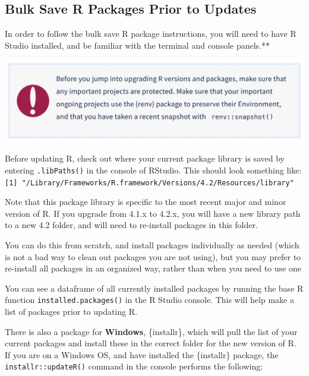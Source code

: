 \documentclass[
]{book}
\begin{document}
\hypertarget{bulk-save-r-packages-prior-to-updates}{%
\subsection{Bulk Save R Packages Prior to Updates}\label{bulk-save-r-packages-prior-to-updates}}

In order to follow the bulk save R package instructions, you will need to have R Studio installed, and be familiar with the terminal and console panels.**

\begin{flushleft}\includegraphics[width=1\linewidth]{images/renv} \end{flushleft}

Before updating R, check out where your current package library is saved by entering \texttt{.libPaths()} in the console of RStudio. This should look something like: \texttt{{[}1{]}\ "/Library/Frameworks/R.framework/Versions/4.2/Resources/library"}

Note that this package library is specific to the most recent major and minor version of R. If you upgrade from 4.1.x to 4.2.x, you will have a new library path to a new 4.2 folder, and will need to re-install packages in this folder.

You can do this from scratch, and install packages individually as needed (which is not a bad way to clean out packages you are not using), but you may prefer to re-install all packages in an organized way, rather than when you need to use one

You can see a dataframe of all currently installed packages by running the base R function \texttt{installed.packages()} in the R Studio console. This will help make a list of packages prior to updating R.

There is also a package for \textbf{Windows}, \{installr\}, which will pull the list of your current packages and install these in the correct folder for the new version of R. If you are on a Windows OS, and have installed the \{installr\} package, the \texttt{installr::updateR()} command in the console performs the following:
\end{document}
